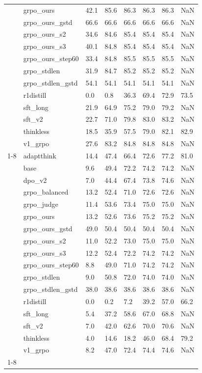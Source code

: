 \begin{table}
\begin{tabular}{llllllll}
 & grpo_ours & 42.1 & 85.6 & 86.3 & 86.3 & 86.3 & NaN \\
 & grpo_ours_gstd & 66.6 & 66.6 & 66.6 & 66.6 & 66.6 & NaN \\
 & grpo_ours_s2 & 34.6 & 84.6 & 85.4 & 85.4 & 85.4 & NaN \\
 & grpo_ours_s3 & 40.1 & 84.8 & 85.4 & 85.4 & 85.4 & NaN \\
 & grpo_ours_step60 & 33.4 & 84.8 & 85.5 & 85.5 & 85.5 & NaN \\
 & grpo_stdlen & 31.9 & 84.7 & 85.2 & 85.2 & 85.2 & NaN \\
 & grpo_stdlen_gstd & 54.1 & 54.1 & 54.1 & 54.1 & 54.1 & NaN \\
 & r1distill & 0.0 & 0.8 & 36.3 & 69.4 & 72.9 & 73.5 \\
 & sft_long & 21.9 & 64.9 & 75.2 & 79.0 & 79.2 & NaN \\
 & sft_v2 & 22.7 & 71.0 & 79.8 & 83.0 & 83.2 & NaN \\
 & thinkless & 18.5 & 35.9 & 57.5 & 79.0 & 82.1 & 82.9 \\
 & v1_grpo & 27.6 & 83.2 & 84.8 & 84.8 & 84.8 & NaN \\
\cline{1-8}
\multirow[t]{17}{*}{math500} & adaptthink & 14.4 & 47.4 & 66.4 & 72.6 & 77.2 & 81.0 \\
 & base & 9.6 & 49.4 & 72.2 & 74.2 & 74.2 & NaN \\
 & dpo_v2 & 7.0 & 44.4 & 67.4 & 73.8 & 74.6 & NaN \\
 & grpo_balanced & 13.2 & 52.4 & 71.0 & 72.6 & 72.6 & NaN \\
 & grpo_judge & 11.4 & 53.6 & 73.4 & 75.0 & 75.0 & NaN \\
 & grpo_ours & 13.2 & 52.6 & 73.6 & 75.2 & 75.2 & NaN \\
 & grpo_ours_gstd & 49.0 & 50.4 & 50.4 & 50.4 & 50.4 & NaN \\
 & grpo_ours_s2 & 11.0 & 52.2 & 73.0 & 75.0 & 75.0 & NaN \\
 & grpo_ours_s3 & 12.2 & 52.4 & 72.2 & 74.2 & 74.2 & NaN \\
 & grpo_ours_step60 & 8.8 & 49.0 & 71.0 & 74.2 & 74.2 & NaN \\
 & grpo_stdlen & 9.0 & 50.8 & 72.0 & 74.0 & 74.0 & NaN \\
 & grpo_stdlen_gstd & 38.0 & 38.6 & 38.6 & 38.6 & 38.6 & NaN \\
 & r1distill & 0.0 & 0.2 & 7.2 & 39.2 & 57.0 & 66.2 \\
 & sft_long & 5.4 & 37.2 & 58.6 & 67.0 & 68.8 & NaN \\
 & sft_v2 & 7.0 & 42.0 & 62.6 & 70.0 & 70.6 & NaN \\
 & thinkless & 4.0 & 14.6 & 18.2 & 46.0 & 68.4 & 79.2 \\
 & v1_grpo & 8.2 & 47.0 & 72.4 & 74.4 & 74.6 & NaN \\
\cline{1-8}
\bottomrule
\end{tabular}
\end{table}
